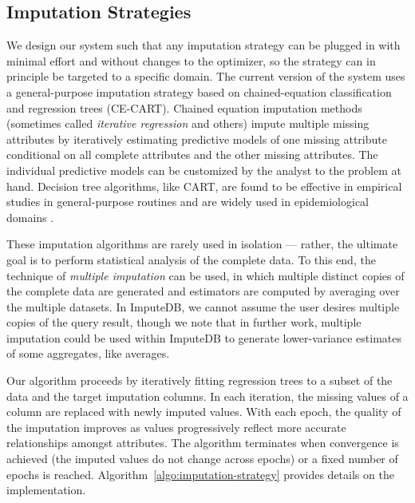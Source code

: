 \begin{algorithm}

\end{algorithm}

\begin{algorithm}

\end{algorithm}

\begin{algorithm}

\end{algorithm}

\subsection{Imputation Strategies}

We design our system such that any imputation strategy can be plugged in with minimal effort
and without changes to the optimizer, so the strategy can in principle be targeted to a
specific domain. The current version of the system uses a general-purpose imputation
strategy based on chained-equation classification and regression trees (CE-CART). Chained
equation imputation methods \cite{vanbuuren2011mice} (sometimes called \textit{iterative
regression} \cite{gelman2006data} and others) impute multiple missing attributes by
iteratively estimating predictive models of one missing attribute conditional on all
complete attributes and the other missing attributes. The individual predictive models can
be customized by the analyst to the problem at hand. Decision tree algorithms, like CART,
are found to be effective \cite{akande2015empirical} in empirical studies in general-purpose
routines and are widely used in epidemiological domains \cite{burgette2010multiple}.  

These imputation algorithms are rarely used in isolation --- rather, the ultimate goal is to
perform statistical analysis of the complete data. To this end, the technique of
\textit{multiple imputation} can be used, in which multiple distinct copies of the complete
data are generated and estimators are computed by averaging over the multiple datasets. In
ImputeDB, we cannot assume the user desires multiple copies of the query result, though we
note that in further work, multiple imputation could be used within ImputeDB to generate
lower-variance estimates of some aggregates, like averages.

Our algorithm proceeds by iteratively fitting regression trees to a subset of the data and
the target imputation columns. In each iteration, the missing values of a column are
replaced with newly imputed values. With each epoch, the quality of the imputation improves
as values progressively reflect more accurate relationships amongst attributes. The
algorithm terminates when convergence is achieved (the imputed values do not change across
epochs) or a fixed number of epochs is reached.  Algorithm~\ref{algo:imputation-strategy}
provides details on the implementation.  


